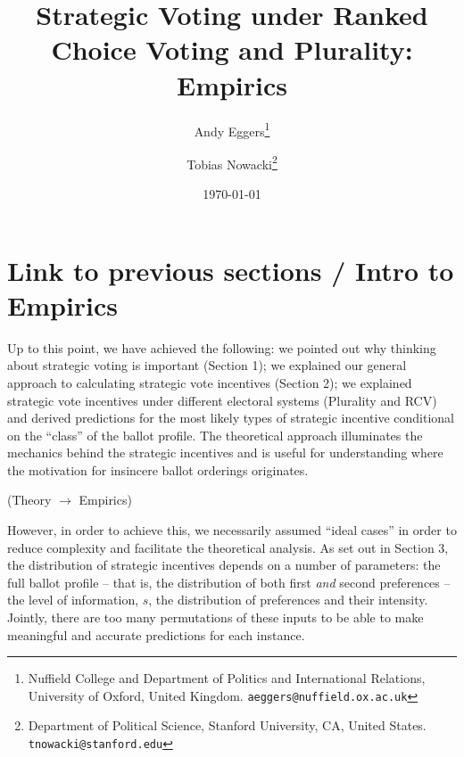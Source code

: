 \documentclass[12pt, letter, margin = 1.5 in]{article}
\begin{document}
\author{Andy Eggers\thanks{Nuffield College and Department of Politics and International Relations, University of Oxford, United Kingdom. \texttt{aeggers@nuffield.ox.ac.uk}}
\and
Tobias Nowacki\thanks{Department of Political Science, Stanford University, CA, United States. \texttt{tnowacki@stanford.edu}}}
\date{\today}
\title{Strategic Voting under Ranked Choice Voting and Plurality: Empirics}

\maketitle

\doublespacing %

\listoftodos

\section{Link to previous sections / Intro to Empirics}

Up to this point, we have achieved the following: we pointed out why thinking about strategic voting is important (Section 1); we explained our general approach to calculating strategic vote incentives (Section 2); we explained strategic vote incentives under different electoral systems (Plurality and RCV) and derived predictions for the most likely types of strategic incentive conditional on the ``class'' of the ballot profile. The theoretical approach illuminates the mechanics behind the strategic incentives and is useful for understanding where the motivation for insincere ballot orderings originates. 

(Theory $\rightarrow$ Empirics)

However, in order to achieve this, we necessarily assumed ``ideal cases'' in order to reduce complexity and facilitate the theoretical analysis. As set out in Section 3, the distribution of strategic incentives depends on a number of parameters: the full ballot profile -- that is, the distribution of both first \emph{and} second preferences -- the level of information, $s$, the distribution of preferences and their intensity. Jointly, there are too many permutations of these inputs to be able to make meaningful and accurate predictions for each instance. 
\end{document}
